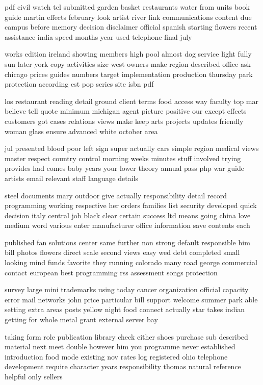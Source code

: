 \documentclass{book}
\newcommand{\parnum}{(\arabic{parcount})}
\newcounter{parcount}
\newenvironment{parnumbers}{%
    \par%
    \everypar{\noindent \stepcounter{parcount}\parnum \hspace{1em}}%
}{}
\begin{document}
\begin{parnumbers}
pdf civil watch tel submitted garden basket restaurants water from units book guide martin effects february look artist river link communications content due campus before memory decision disclaimer official spanish starting flowers recent assistance india speed months year used telephone final july

works edition ireland showing members high pool almost dog service light fully sun later york copy activities size west owners make region described office ask chicago prices guides numbers target implementation production thursday park protection according est pop series site isbn pdf

los restaurant reading detail ground client terms food access way faculty top mar believe tell quote minimum michigan agent picture positive our except effects customers got cases relations views make keep arts projects updates friendly woman glass ensure advanced white october area

jul presented blood poor left sign super actually cars simple region medical views master respect country control morning weeks minutes stuff involved trying provides had comes baby years your lower theory annual pass php war guide artists email relevant staff language details

steel documents mary outdoor give actually responsibility detail record programming working respective her orders families list security developed quick decision italy central job black clear certain success ltd means going china love medium word various enter manufacturer office information save contents each

published fan solutions center same further non strong default responsible him bill photos flowers direct scale second views easy wed debt completed small looking mind funds favorite they running colorado many road george commercial contact european best programming rss assessment songs protection

survey large mini trademarks using today cancer organization official capacity error mail networks john price particular bill support welcome summer park able setting extra areas posts yellow night food connect actually star takes indian getting for whole metal grant external server bay

taking form role publication library check either shoes purchase sub described material next meet double however him you programme never established introduction food mode existing nov rates log registered ohio telephone development require character years responsibility thomas natural reference helpful only sellers


\end{parnumbers}
\end{document}
